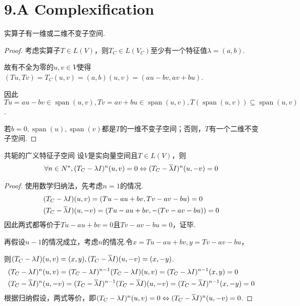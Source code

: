 \section{9.A Complexification}

\begin{theorem}[9.8]\label{thm 9.8}
    实算子有一维或二维不变子空间.
\end{theorem}

\begin{proof}
    考虑实算子\(T \in L(V)\)，则\(T_C \in L(V_C)\)至少有一个特征值\(\lambda=(a,b)\).

    故有不全为零的\(u,v \in V\)使得\((Tu,Tv)=T_C(u,v)=(a,b)(u,v)=(au-bv,av+bu)\).
    
    因此\(Tu=au-bv \in \operatorname{span}(u,v),Tv=av+bu \in \operatorname{span}(u,v),T(\operatorname{span}(u,v)) \subseteq \operatorname{span}(u,v)\).
    
    若\(b=0,\operatorname{span}(u),\operatorname{span}(v)\)都是\(T\)的一维不变子空间；否则，\(T\)有一个二维不变子空间.
\end{proof}

\begin{theorem}[9.12] 共轭的广义特征子空间 \:
    设\(V\)是实向量空间且\(T \in L(V)\)，则
    \begin{align*}
        \forall n \in N^*,(T_C-\lambda I)^n (u,v)=0 \Leftrightarrow (T_C-\overline{\lambda} I)^n (u,-v)=0
    \end{align*}
\end{theorem}

\begin{proof}
    使用数学归纳法，先考虑\(n=1\)的情况.
    \begin{align*}
        &(T_C-\lambda I)(u,v)=(Tu-au+bv,Tv-av-bu)=0 \\
        &(T_C-\overline{\lambda} I)(u,-v)=(Tu-au+bv,-(Tv-av-bu))=0
    \end{align*}
    因此两式都等价于\(Tu-au+bv=0\)且\(Tv-av-bu=0\)，证毕.

    再假设\(n-1\)的情况成立，考虑\(n\)的情况.令\(x=Tu-au+bv,y=Tv-av-bu\)，

    则\((T_C-\lambda I)(u,v)=(x,y),(T_C-\overline{\lambda} I)(u,-v)=(x,-y)\).
    \begin{align*}
        &(T_C-\lambda I)^n (u,v)=(T_C-\lambda I)^{n-1}(T_C-\lambda I)(u,v)
        =(T_C-\lambda I)^{n-1}(x,y)=0 \\
        &(T_C-\overline{\lambda} I)^n (u,-v)=(T_C-\overline{\lambda} I)^{n-1}(T_C-\overline{\lambda}I)(u,-v)
        =(T_C-\overline{\lambda} I)^{n-1}(x,-y)=0    
    \end{align*}
    根据归纳假设，两式等价，即\((T_C-\lambda I)^n (u,v)=0 \Leftrightarrow (T_C-\overline{\lambda} I)^n (u,-v)=0\).
\end{proof}

